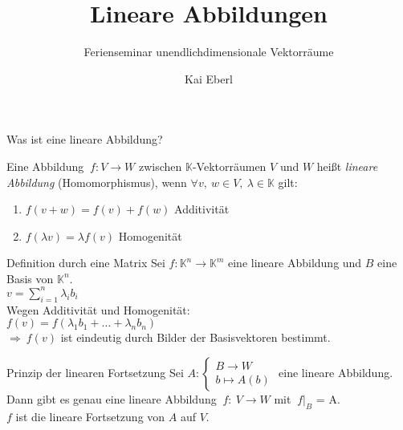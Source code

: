 \documentclass[AERbeamer%
,handout%
,optBeamerClassicFormat%
,optLeftEquations   %
]{AERlatex}
\title{Lineare Abbildungen}%
\subtitle{Ferienseminar unendlichdimensionale Vektorräume}%
\author{Kai Eberl}%
\date{\AERutilsDate{5}{9}{2022}}%
\begin{document}
%
%
    \AERbeamerTitlePageDefault%
%
    \begin{frame}{Was ist eine lineare Abbildung?}%
        \begin{Definition}
            Eine Abbildung $~f: V \rightarrow W$ zwischen $\mathbb{K}$-Vektorräumen $V$ und $W$ heißt \emph{lineare Abbildung} (Homomorphismus), wenn $\forall v, ~ w \in V, ~ \lambda \in \mathbb{K}$ gilt: \\ \pause
            \begin{enumerate}
                [label=$(\roman*)$, leftmargin=2em]
                \item $f(v+w) = f(v) + f(w)$ \hspace{2em} Additivität \pause
                \item $f(\lambda v) = \lambda f(v)$ \hspace{6em} Homogenität
            \end{enumerate}
        \end{Definition}
    \end{frame}%
%
    \begin{frame}{Definition durch eine Matrix}
        \setlength{\baselineskip}{1.6\baselineskip}
%
        Sei $f: \mathbb{K}^n \rightarrow \mathbb{K}^m$ eine lineare Abbildung und $B$ eine Basis von $\mathbb{K}^n$. \\
        $v = \sum_{i=1}^n \lambda_i b_i$ \\ \pause
        Wegen Additivität und Homogenität: \\
        $f(v) = f(\lambda_1 b_1 + \dots + \lambda_n b_n)$ \\ \pause
        $\Rightarrow ~ f(v)$ ist eindeutig durch Bilder der Basisvektoren bestimmt. \\
        \begin{block}{Prinzip der linearen Fortsetzung}
            Sei $A:\left\{\begin{array}{l}
                              B \rightarrow W \\ b \mapsto A(b)
            \end{array} \right.$ eine lineare Abbildung.                                         \\
            Dann gibt es genau eine lineare Abbildung $~ f: ~ V \rightarrow W$ mit $~ f|_B$ = A. \\
            $f$ ist die lineare Fortsetzung von $A$ auf $V$.
        \end{block}
    \end{frame}
%
\end{document}
